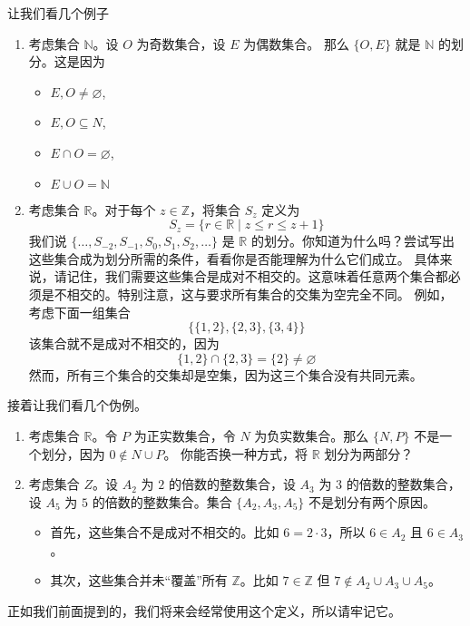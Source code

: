 \begin{example}
    让我们看几个例子
    \begin{enumerate}[label=(\arabic*)]
        \item 考虑集合 $\mathbb{N}$。设 $O$ 为奇数集合，设 $E$ 为偶数集合。 那么 $\{O, E\}$ 就是 $\mathbb{N}$ 的划分。这是因为
        \begin{itemize}
            \item $E, O \ne \varnothing$,
            \item $E, O \subseteq N$,
            \item $E \cap O = \varnothing$,
            \item $E \cup O = \mathbb{N}$ 
        \end{itemize}
        \item 考虑集合 $\mathbb{R}$。对于每个 $z \in \mathbb{Z}$，将集合 $S_z$ 定义为
        \[S_z = \{r \in \mathbb{R} \mid z \le r \le z + 1\}\]
        我们说 $\{\dots, S_{-2}, S_{-1}, S_0, S_1, S_2, \dots \}$ 是 $\mathbb{R}$ 的划分。你知道为什么吗？尝试写出这些集合成为划分所需的条件，看看你是否能理解为什么它们成立。
        具体来说，请记住，我们需要这些集合是成对不相交的。这意味着任意两个集合都必须是不相交的。特别注意，这与要求所有集合的交集为空完全不同。
        例如，考虑下面一组集合
        \[\big\{\{1, 2\}, \{2, 3\}, \{3, 4\}\big\}\]
        该集合就不是成对不相交的，因为
        \[\{1, 2\} \cap \{2, 3\} = \{2\} \ne \varnothing\]
        然而，所有三个集合的交集却是空集，因为这三个集合没有共同元素。
    \end{enumerate}
\end{example}

\begin{example}
    接着让我们看几个伪例。
    \begin{enumerate}[label=(\arabic*)]
        \item 考虑集合 $\mathbb{R}$。令 $P$ 为正实数集合，令 $N$ 为负实数集合。那么 $\{N, P\}$ 不是一个划分，因为 $0 \notin N \cup P$。
        你能否换一种方式，将 $\mathbb{R}$ 划分为两部分？
        \item 考虑集合 $Z$。设 $A_2$ 为 $2$ 的倍数的整数集合，设 $A_3$ 为 $3$ 的倍数的整数集合，设 $A_5$ 为 $5$ 的倍数的整数集合。集合 $\{A_2, A_3, A_5\}$ 不是划分有两个原因。
        \begin{itemize}
            \item 首先，这些集合不是成对不相交的。比如 $6=2 \cdot 3$，所以 $6 \in A_2$ 且 $6 \in A_3$。
            \item 其次，这些集合并未``覆盖''所有 $\mathbb{Z}$。比如 $7 \in \mathbb{Z}$ 但 $7 \notin A_2 \cup A_3 \cup A_5$。
        \end{itemize}
    \end{enumerate}
\end{example}

正如我们前面提到的，我们将来会经常使用这个定义，所以请牢记它。

